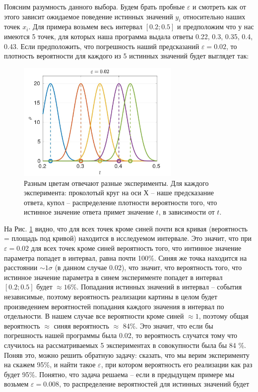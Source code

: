 \documentclass[a4paper,12pt]{article} %
\begin{document}
Поясним разумность данного выбора. Будем брать пробные $\varepsilon$ и смотреть как от этого зависит ожидаемое поведение истинных значений $y_i$ относительно наших точек $x_i$. Для примера возьмем весь интервал $[0.2; 0.5]$ и предположим что у нас имеются 5 точек, для которых наша программа выдала ответы 0.22, 0.3, 0.35, 0.4, 0.43. Если предположить, что погрешность наший предсказаний $\varepsilon = 0.02$, то плотность вероятности для каждого из 5 истинных значений будет выглядет так:

\begin{figure}[h!]
\begin{center}
\includegraphics[width=0.7\textwidth]{./pics/peaks_med}
\end{center}
\caption{Разным цветам отвечают разные эксперименты. Для каждого эксперимента: проколотый круг на оси Х -- наше предсказание ответа, купол -- распределение плотности вероятности того, что истинное значение ответа примет значение $t$, в зависимости от $t$.} \label{img:peaks_med}
\end{figure}

На Рис. \ref{img:peaks_med} видно, что для всех точек кроме синей почти вся кривая (вероятность = площадь под кривой) находится в исследуемом интервале. Это значит, что при $\varepsilon = 0.02$ для всех точек кроме синей вероятность того, что интинное значение параметра попадет в интервал, равна почти 100\%. Синяя же точка находится на расстоянии $\sim 1 \sigma$ (в данном случае 0.02), что значит, что вероятность того, что истинное значение параметра в синем эксперименте попадет в интервал $[0.2; 0.5]$ будет $\approx 16 \%$. Попадания истинных значений в интервал -- события независимые, поэтому вероятность реализации картины в целом будет произведением вероятностей попадания каждого значения в интервал по отдельности. В нашем случае все вероятности кроме синей $\approx 1$, поэтому общая вероятность $\approx$ синяя вероятность $\approx$ 84\%. Это значит, что если бы погрешность нашей программы была 0.02, то вероятность случатся тому что случилось на рассматриваемых 5 экспериментах в совокупности была бы 84 \%. Поняв это, можно решить обратную задачу: сказать, что мы верим эксперименту на скажем 95\%, и найти такое $\varepsilon$, при котором вероятность его реализации как раз будет 95\%. Понятно, что задача решаема -- если в предыдущем примере мы возьмем $\varepsilon = 0.008$, то распределение вероятностей для истинных значений будет 
\end{document}
